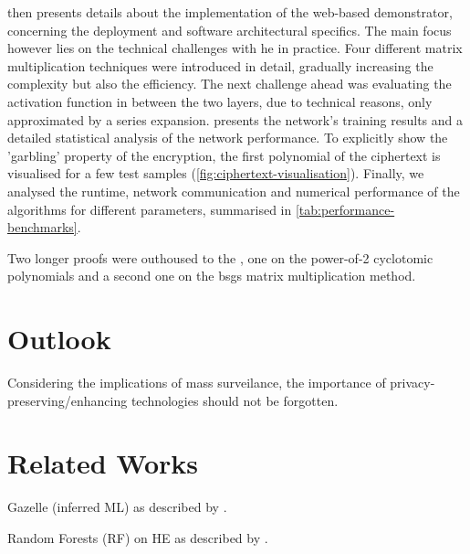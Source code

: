  then presents details about the implementation of the web-based demonstrator, concerning the deployment and software architectural specifics.
The main focus however lies on the technical challenges with \glsdesc{he} in practice.
Four different matrix multiplication techniques were introduced in detail, gradually increasing the complexity but also the efficiency.
The next challenge ahead was evaluating the activation function in between the two layers, due to technical reasons, only approximated by a series expansion.
 presents the network's training results and a detailed statistical analysis of the network performance.
To explicitly show the 'garbling' property of the encryption, the first polynomial of the ciphertext is visualised for a few test samples (\cref{fig:ciphertext-visualisation}).
Finally, we analysed the runtime, network communication and numerical performance of the algorithms for different parameters, summarised in \cref{tab:performance-benchmarks}.

Two longer proofs were outhoused to the , one on the power-of-2 cyclotomic polynomials and a second one on the \gls{bsgs} matrix multiplication method.

\section{Outlook}

Considering the implications of mass surveilance, the importance of privacy-preserving/enhancing technologies should not be forgotten.

\section{Related Works}

Gazelle (inferred ML) as described by \cite{2018-gazelle}.

Random Forests (RF) on HE as described by \cite{2020-cryptotree}.
